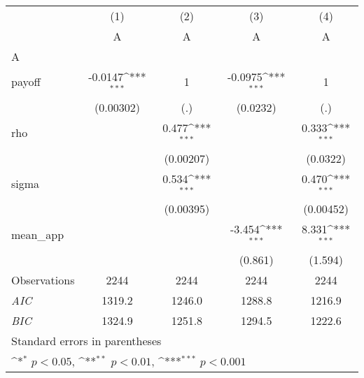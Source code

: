 {
\def\sym#1{\ifmmode^{#1}\else\(^{#1}\)\fi}
\begin{tabular}{l*{4}{c}}
\hline\hline
                    &\multicolumn{1}{c}{(1)}&\multicolumn{1}{c}{(2)}&\multicolumn{1}{c}{(3)}&\multicolumn{1}{c}{(4)}\\
                    &\multicolumn{1}{c}{A}&\multicolumn{1}{c}{A}&\multicolumn{1}{c}{A}&\multicolumn{1}{c}{A}\\
\hline
A                   &                     &                     &                     &                     \\
payoff              &     -0.0147\sym{***}&           1         &     -0.0975\sym{***}&           1         \\
                    &   (0.00302)         &         (.)         &    (0.0232)         &         (.)         \\
[1em]
rho                 &                     &       0.477\sym{***}&                     &       0.333\sym{***}\\
                    &                     &   (0.00207)         &                     &    (0.0322)         \\
[1em]
sigma               &                     &       0.534\sym{***}&                     &       0.470\sym{***}\\
                    &                     &   (0.00395)         &                     &   (0.00452)         \\
[1em]
mean\_app            &                     &                     &      -3.454\sym{***}&       8.331\sym{***}\\
                    &                     &                     &     (0.861)         &     (1.594)         \\
\hline
Observations        &        2244         &        2244         &        2244         &        2244         \\
\textit{AIC}        &      1319.2         &      1246.0         &      1288.8         &      1216.9         \\
\textit{BIC}        &      1324.9         &      1251.8         &      1294.5         &      1222.6         \\
\hline\hline
\multicolumn{5}{l}{\footnotesize Standard errors in parentheses}\\
\multicolumn{5}{l}{\footnotesize \sym{*} \(p<0.05\), \sym{**} \(p<0.01\), \sym{***} \(p<0.001\)}\\
\end{tabular}
}
